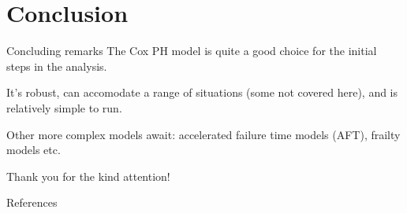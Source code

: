 \documentclass[12pt,english,pdf,xcolor=dvipsnames,aspectratio=169,handout]{beamer}\usepackage[]{graphicx}\usepackage[]{xcolor}
\begin{document}
\section{Conclusion}

\begin{frame}{Concluding remarks}
The Cox PH model is quite a good choice for the initial steps in the analysis.\bigskip

It's robust, can accomodate a range of situations (some not covered here), and is relatively simple to run.\bigskip

Other more complex models await: accelerated failure time models (AFT), frailty models etc.
\end{frame}


\begin{frame}
\begin{center}
    \Huge Thank \textcolor{title}{you} for the kind attention!
\end{center}
\end{frame}

\begin{frame}{References}


\end{frame}
\end{document}
